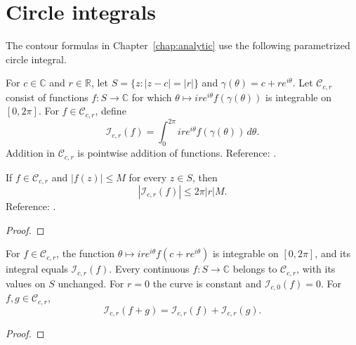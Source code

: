 \section{Circle integrals}\label{sec:textbook-foundations-circles}

The contour formulas in Chapter~\ref{chap:analytic} use the following parametrized circle integral.

\begin{definition}
\label{def:circle-integral-input}
\leanok
For $c\in\mathbb C$ and $r\in\mathbb R$, let
$S=\{z:|z-c|=|r|\}$ and $\gamma(\theta)=c+r e^{i\theta}$.
Let $\mathcal C_{c,r}$ consist of functions $f:S\to\mathbb C$ for which
$\theta\mapsto i r e^{i\theta}f(\gamma(\theta))$ is integrable on $[0,2\pi]$.
For $f\in\mathcal C_{c,r}$, define
\[
\mathcal I_{c,r}(f)=\int_0^{2\pi}i r e^{i\theta}f(\gamma(\theta))\,d\theta.
\]
Addition in $\mathcal C_{c,r}$ is pointwise addition of functions.
Reference: \cite[proof of Theorem 8.1]{atap}.
\end{definition}

\begin{theorem}
\label{thm:circle-integral-bound}
\leanok
If $f\in\mathcal C_{c,r}$ and $|f(z)|\le M$ for every $z\in S$, then
\[
|\mathcal I_{c,r}(f)|\le 2\pi |r| M.
\]
Reference: \cite[proof of Theorem 8.1]{atap}.
\end{theorem}
\begin{proof}
\leanok
\end{proof}

\begin{supporting}

\begin{theorem}
\label{thm:circle-integral-input}
\leanok
For $f\in\mathcal C_{c,r}$, the function
$\theta\mapsto i r e^{i\theta}f(c+r e^{i\theta})$ is integrable on $[0,2\pi]$,
and its integral equals $\mathcal I_{c,r}(f)$.
Every continuous $f:S\to\mathbb C$ belongs to $\mathcal C_{c,r}$, with its
values on $S$ unchanged. For $r=0$ the curve is constant and
$\mathcal I_{c,0}(f)=0$. For $f,g\in\mathcal C_{c,r}$,
\[
\mathcal I_{c,r}(f+g)=\mathcal I_{c,r}(f)+\mathcal I_{c,r}(g).
\]
\end{theorem}
\begin{proof}
\leanok
\end{proof}

\end{supporting}

